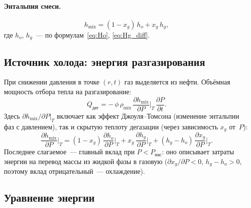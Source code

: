 \documentclass[12pt,a4paper]{article}
\begin{document}
\paragraph{Энтальпия смеси.}
\begin{equation}\label{eq:hmix_local}
  h_{\mathrm{mix}} = (1 - x_g)\,h_o + x_g\,h_g,
\end{equation}
где $h_o$, $h_g$~--- по формулам~\eqref{eq:Ho}, \eqref{eq:Hg_diff}.

\subsection{Источник холода: энергия разгазирования}

При снижении давления в точке $(r,t)$ газ выделяется из нефти.
Объёмная мощность отбора тепла на разгазирование:
\begin{equation}\label{eq:Q_degas}
  \boxed{\;
    Q_{\text{дег}} = -\,\phi\,\rho_{\mathrm{mix}}\,
    \frac{\partial h_{\mathrm{mix}}}{\partial P}\bigg|_{T}\,
    \frac{\partial P}{\partial t}.
  \;}
\end{equation}
Здесь $\partial h_{\mathrm{mix}}/\partial P\big|_T$ включает как
эффект Джоуля--Томсона (изменение энтальпии фаз с давлением), так и
скрытую теплоту дегазации (через зависимость $x_g$ от~$P$):
\begin{equation}\label{eq:dh_dP}
  \frac{\partial h_{\mathrm{mix}}}{\partial P}\bigg|_{T}
  = (1-x_g)\,\frac{\partial h_o}{\partial P}\bigg|_T
  + x_g\,\frac{\partial h_g}{\partial P}\bigg|_T
  + (h_g - h_o)\,\frac{\partial x_g}{\partial P}\bigg|_T.
\end{equation}
Последнее слагаемое~--- главный вклад при $P < P_{\text{нас}}$:
оно описывает затраты энергии на перевод массы из жидкой фазы в
газовую ($\partial x_g/\partial P < 0$, $h_g - h_o > 0$, поэтому вклад
отрицательный~--- охлаждение).

\subsection{Уравнение энергии}
\end{document}
